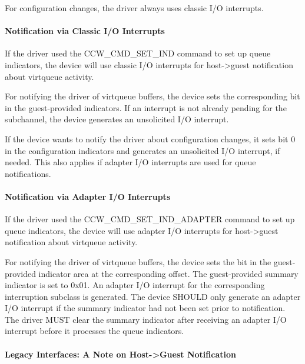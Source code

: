 For configuration changes, the driver always uses classic I/O
interrupts.

\paragraph{Notification via Classic I/O Interrupts}\label{sec:Virtio Transport Options / Virtio over channel I/O / Device Operation / Host->Guest Notification / Notification via Classic I/O Interrupts}

If the driver used the CCW_CMD_SET_IND command to set up queue
indicators, the device will use classic I/O interrupts for
host->guest notification about virtqueue activity.

For notifying the driver of virtqueue buffers, the device sets the
corresponding bit in the guest-provided indicators. If an
interrupt is not already pending for the subchannel, the device
generates an unsolicited I/O interrupt.

If the device wants to notify the driver about configuration
changes, it sets bit 0 in the configuration indicators and
generates an unsolicited I/O interrupt, if needed. This also
applies if adapter I/O interrupts are used for queue notifications.

\paragraph{Notification via Adapter I/O Interrupts}\label{sec:Virtio Transport Options / Virtio over channel I/O / Device Operation / Host->Guest Notification / Notification via Adapter I/O Interrupts}

If the driver used the CCW_CMD_SET_IND_ADAPTER command to set up
queue indicators, the device will use adapter I/O interrupts for
host->guest notification about virtqueue activity.

For notifying the driver of virtqueue buffers, the device sets the
bit in the guest-provided indicator area at the corresponding offset.
The guest-provided summary indicator is set to 0x01. An adapter I/O
interrupt for the corresponding interruption subclass is generated.
The device SHOULD only generate an adapter I/O interrupt if the
summary indicator had not been set prior to notification. The driver
MUST clear the summary indicator after receiving an adapter I/O
interrupt before it processes the queue indicators.

\paragraph{Legacy Interfaces: A Note on Host->Guest Notification}\label{sec:Virtio Transport Options / Virtio over channel I/O / Device Operation / Host->Guest Notification / Legacy Interfaces: A Note on Host->Guest Notification}

